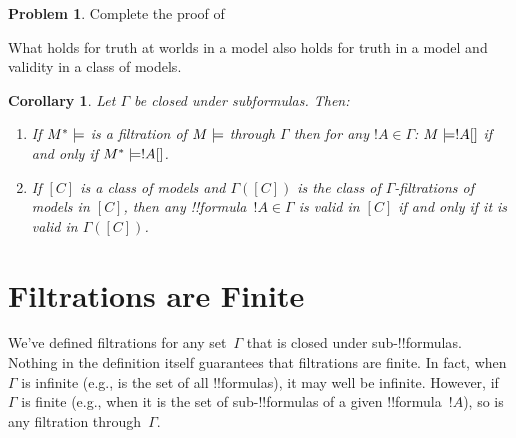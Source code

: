 \documentclass[10pt,a4paper]{article}
\makeatletter
\theoremstyle{plain}
\newtheorem{cor}[thm]{Corollary}
\theoremstyle{definition}
\newtheorem{prob}{Problem}[section]
\theoremstyle{remark}
\newcommand*{\olfileid}[3]{}
\newcommand*{\olsection}[1]{\section*{#1}}
\newcommand*{\olchapter}[3]{}
\newcommand*{\olimport}[1]{}
\newcommand{\olref}{\@ifnextchar[{\olref@i}{\olref@final}}
\def\olref@i[#1]{\@ifnextchar[{\olref@ii}{\olref@final}}
\def\olref@ii[#1]{\@ifnextchar[{\olref@iii}{\olref@final}}
\def\olref@iii[#1]{\olref@final}
\def\olref@final#1{\ref{#1}}
\providecommand{\mSat}[3]{\ensuremath{#1 \models #2[#3]}}
\providecommand{\mModel}[2]{\ensuremath{#1 \models #2}}
\providecommand{\mClass}[1]{[#1]}
\makeatother
\begin{document}
\begin{prob}
  Complete the proof of \olref[nml][fil][fil]{thm:filtrations}
\end{prob}

What holds for truth at worlds in a model also holds for truth in a
model and validity in a class of models.

\begin{cor}
  Let $\Gamma$ be closed under subformulas. Then:
  \begin{enumerate}
  \item If $\mModel{M^*}$ is a filtration of $\mModel{M}$ through
    $\Gamma$ then for any $!A \in \Gamma$: $\mSat{M}{!A}$ if and only
    if $\mSat{M^*}{!A}$.
  \item If $\mClass{C}$ is a class of models and $\Gamma(\mClass{C})$
    is the class of $\Gamma$-filtrations of models in $\mClass{C}$,
    then any !!{formula}~$!A \in \Gamma$ is valid in $\mClass{C}$ if
    and only if it is valid in $\Gamma(\mClass{C})$.
  \end{enumerate}
\end{cor}







\olchapter{nml}{fil}{Filtrations and Decidability}

\olimport{introduction}
\olimport{preliminaries}
\olimport{filtrations-def}
\olimport{examples-of-filtrations}
\olimport{finite}
\olimport{S5-fmp}
\olimport{S5-decidable}
\olimport{more-filtrations}
\olimport{euclidean-filtrations}

\OLEndChapterHook






\olfileid{nml}{fil}{fin}

\olsection{Filtrations are Finite}

We've defined filtrations for any set~$\Gamma$ that is closed under
sub-!!{formula}s. Nothing in the definition itself guarantees that
filtrations are finite. In fact, when $\Gamma$ is infinite (e.g., is
the set of all !!{formula}s), it may well be infinite. However, if
$\Gamma$ is finite (e.g., when it is the set of sub-!!{formula}s of a
given !!{formula}~$!A$), so is any filtration through~$\Gamma$.
\end{document}

